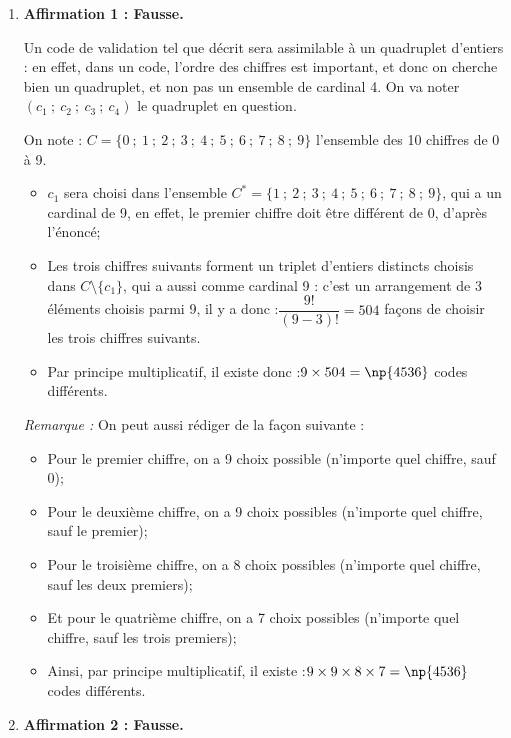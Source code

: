 \medskip

	\begin{enumerate}
		\item \textbf{Affirmation 1 : Fausse.}

		Un code de validation tel que décrit sera assimilable à un quadruplet d'entiers : en effet, dans un code, l'ordre des chiffres est important, et donc on cherche bien un quadruplet, et non pas un ensemble de cardinal 4. On va noter $(c_1~;~c_2~;~c_3~;~c_4)$ le quadruplet en question.

		On note : $C = \big\{0~;~1~;~2~;~3~;~4~;~5~;~6~;~7~;~8~;~9\big\}$ l'ensemble des 10 chiffres de 0 à 9.

		\begin{itemize}
			\item $c_1$ sera choisi dans l'ensemble $C^* = \big\{1~;~2~;~3~;~4~;~5~;~6~;~7~;~8~;~9\big\}$, qui a un cardinal de 9, en effet, le premier chiffre doit être différent de 0, d'après l'énoncé;
			\item Les trois chiffres suivants forment un triplet d'entiers distincts choisis dans $C \setminus \big\{c_1\big\}$, qui a aussi comme cardinal 9 : c'est un arrangement de 3 éléments choisis parmi 9, il y a donc :\quad $\dfrac{9!}{(9 - 3)!} = 504$ façons de choisir les trois chiffres suivants.
			\item Par principe multiplicatif, il existe donc :\quad $9 \times 504 = \np{4536}$ codes différents.
		\end{itemize}

	\emph{Remarque :} On peut aussi rédiger de la façon suivante :
	\begin{itemize}
		\item Pour le premier chiffre, on a 9 choix possible (n'importe quel chiffre, sauf 0);
		\item 	Pour le deuxième chiffre, on a 9 choix possibles (n'importe quel chiffre, sauf le premier);
		\item 	Pour le troisième chiffre, on a 8 choix possibles (n'importe quel chiffre, sauf les deux premiers);
		\item 	Et pour le quatrième chiffre, on a 7 choix possibles (n'importe quel chiffre, sauf les trois premiers);
		\item 	Ainsi, par principe multiplicatif, il existe :\quad $ 9 \times 9 \times 8 \times 7 = \np{4536}$ codes  différents.
	\end{itemize}

	\item \textbf{Affirmation 2 : Fausse.}


\end{enumerate}
